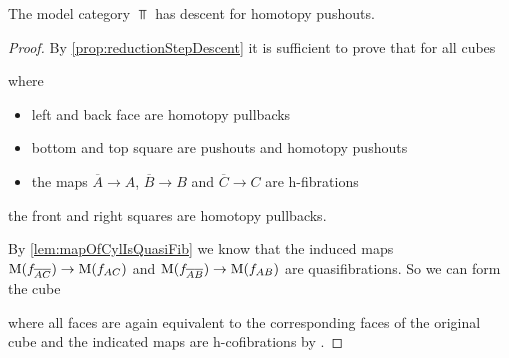 \begin{prop}\label{lem:topDescentPo}
    The model category $\Top$ has descent for homotopy pushouts. 
    \begin{proof}
        By \cref{prop:reductionStepDescent} it is sufficient to prove that for all cubes 
        \begin{center}
        \end{center}
        where 
        \begin{itemize}
            \item left and back face are homotopy pullbacks
            \item bottom and top square are pushouts and homotopy pushouts
            \item the maps $\overline{A}\to A$, $\overline{B}\to B$ and $\overline{C}\to C$ are h-fibrations
        \end{itemize}
        the front and right squares are homotopy pullbacks.

        By \cref{lem:mapOfCylIsQuasiFib} we know that the induced maps $\operatorname{M}(f_{\overline{A}\overline{C}})\to\operatorname{M}(f_{AC})$ and $\operatorname{M}(f_{\overline{A}\overline{B}})\to\operatorname{M}(f_{AB})$ are quasifibrations. %
        So we can form the cube 
        \begin{center}
        \end{center}
        where all faces are again equivalent to the corresponding faces of the original cube and the indicated maps are h-cofibrations by %
        .
        

\end{proof}
\end{prop}
